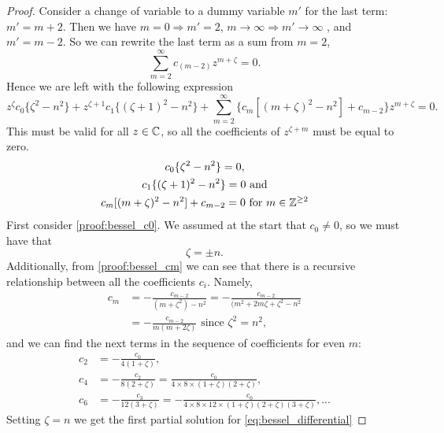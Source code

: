 \begin{proof}
  Consider a change of variable to a dummy variable $m'$ for the last term: $m'=m+2$. Then we have $m=0 \Rightarrow m'=2$, $m\rightarrow \infty \Rightarrow m' \rightarrow \infty$ , and $m'= m-2$. So we can rewrite the last term as a sum from $m=2$,
    \begin{equation}
      \sum_{m=2}^\infty c_{(m-2)} z^{m + \zeta} =0.
    \end{equation}
  Hence we are left with the following expression
    \begin{equation}
      z^{\zeta} c_0\{ \zeta^2 - n^2\} + z^{\zeta+1} c_1 \{ (\zeta+1)^2 -n^2\}
      + \sum_{m=2}^\infty \{ c_m [(m+\zeta)^2 -n^2] + c_{m-2} \}z^{m + \zeta} =0.
    \end{equation}
  This must be valid for all $z \in \mathbb{C}$, so all the coefficients of $z^{\zeta +m}$ must be equal to zero.
    \begin{gather}
      c_0\{ \zeta^2 - n^2\} = 0,\label{proof:bessel_c0} \\
      c_1 \{ (\zeta+1)^2 -n^2\} = 0 \label{proof:bessel_c1}\text{ and}\\
      c_m [(m+\zeta)^2 -n^2] + c_{m-2} = 0 \text{ for } m \in \mathbb{Z}^{\geq 2} \label{proof:bessel_cm}
    \end{gather}
  First consider \eqref{proof:bessel_c0}. We assumed at the start that $c_0\neq0$, so we must have that
      \begin{equation}
        \zeta = \pm n.
      \end{equation}
  Additionally, from \eqref{proof:bessel_cm} we can see that there is a recursive relationship between all the coefficients $c_i$. Namely,
    \begin{align}
      c_m &= - \frac{c_{m-2}}{(m+\zeta^2)-n^2} = - \frac{c_{m-2}}{(m^2 +2m\zeta + \zeta^2 -n^2} \\
      &= - \frac{c_{m-2}}{m(m +2\zeta)} \text{ since } \zeta^2 = n^2,
    \end{align}
  and we can find the next terms in the sequence of coefficients for even $m$:
    \begin{align*}
      c_2 &= - \frac{c_0}{4(1+\zeta)}, \\
      c_4 &= - \frac{c_2}{8(2+\zeta)} = \frac{c_0}{4 \times 8 \times (1+\zeta) (2+\zeta)}, \\
      c_6 &= - \frac{c_3}{12(3+\zeta)} = - \frac{c_0}{4 \times 8 \times 12 \times (1+\zeta) (2+\zeta)(3+\zeta)}, ...
    \end{align*}
  Setting $\zeta = n$ we get the first partial solution for \eqref{eq:bessel_differential}

\end{proof}
